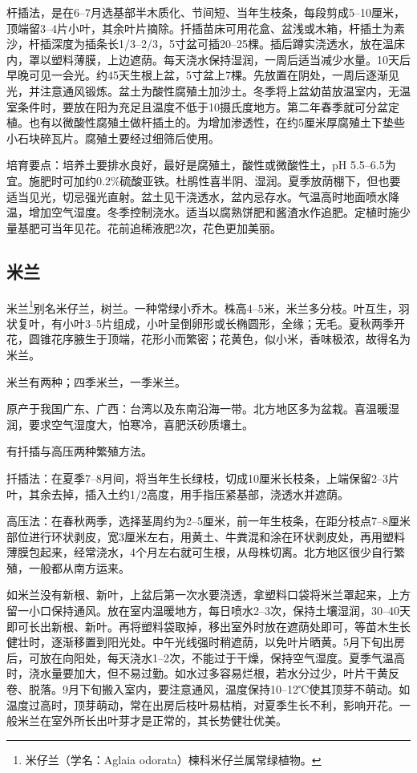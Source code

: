 \documentclass{ctexbook}
\begin{document}
杆插法，是在6--7月选基部半木质化、节间短、当年生枝条，每段剪成5--10厘米，顶端留3--4片小叶，其余叶片摘除。扦插苗床可用花盒、盆浅或木箱，杆插土为素沙，杆插深度为插条长1/3--2/3，5寸盆可插20--25棵。插后蹲实浇透水，放在温床内，罩以塑料薄膜，上边遮荫。每天浇水保持湿润，一周后适当减少水量。10天后早晚可见一会光。约45天生根上盆，5寸盆上7棵。先放置在阴处，一周后逐渐见光，并注意通风锻炼。盆土为酸性腐殖土加沙土。冬季将上盆幼苗放温室内，无温室条件时，要放在阳为充足且温度不低于10摄氏度地方。第二年春季就可分盆定植。也有以微酸性腐殖土做杆插土的。为增加渗透性，在约5厘米厚腐殖土下垫些小石块碎瓦片。腐殖土要经过细筛后使用。

培育要点：培养土要排水良好，最好是腐殖土，酸性或微酸性土，pH 5.5--6.5为宜。施肥时可加约0.2\%硫酸亚铁。杜鹃性喜半阴、湿润。夏季放荫棚下，但也要适当见光，切忌强光直射。盆土见干浇透水，盆内忌存水。气温高时地面喷水降温，增加空气湿度。冬季控制浇水。适当以腐熟饼肥和酱渣水作追肥。定植时施少量基肥可当年见花。花前追稀液肥2次，花色更加美丽。
\subsection{米兰}
米兰\footnote{米仔兰（学名：Aglaia odorata）楝科米仔兰属常绿植物。}别名米仔兰，树兰。一种常绿小乔木。株高4--5米，米兰多分枝。叶互生，羽状复叶，有小叶3--5片组成，小叶呈倒卵形或长椭圆形，全缘；无毛。夏秋两季开花，圆锥花序腋生于顶端，花形小而繁密；花黄色，似小米，香味极浓，故得名为米兰。

米兰有两种；四季米兰，一季米兰。

原产于我国广东、广西：台湾以及东南沿海一带。北方地区多为盆栽。喜温暖湿润，要求空气湿度大，怕寒冷，喜肥沃砂质壤土。

有扦插与高压两种繁殖方法。

扦插法：在夏季7--8月间，将当年生长绿枝，切成10厘米长枝条，上端保留2--3片叶，其余去掉，插入土约1/2高度，用手指压紧基部，浇透水并遮荫。

高压法：在春秋两季，选择茎周约为2--5厘米，前一年生枝条，在距分枝点7--8厘米部位进行环状剥皮，宽3厘米左右，用黄土、牛粪混和涂在环状剥皮处，再用塑料薄膜包起来，经常浇水，4个月左右就可生根，从母株切离。北方地区很少自行繁殖，一般都从南方运来。

如米兰没有新根、新叶，上盆后第一次水要浇透，拿塑料口袋将米兰罩起来，上方留一小口保持通风。放在室内温暖地方，每日喷水2--3次，保持土壤湿润，30--40天即可长出新根、新叶。再将塑料袋取掉，移出室外时放在遮荫处即可，等苗木生长健壮时，逐渐移置到阳光处。中午光线强时稍遮荫，以免叶片晒黄。5月下旬出房后，可放在向阳处，每天浇水1--2次，不能过于干燥，保持空气湿度。夏季气温高时，浇水量要加大，但不易过勤。如水过多容易烂根，若水分过少，叶片干黄反卷、脱落。9月下旬搬入室内，要注意通风，温度保持10--12℃使其顶芽不萌动。如温度过高时，顶芽萌动，常在出房后枝叶易枯梢，对夏季生长不利，影响开花。一般米兰在室外所长出叶芽才是正常的，其长势健壮优美。
\end{document}
